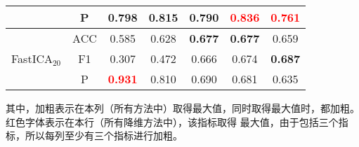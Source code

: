 \documentclass{acm_proc_article-sp}
\begin{document}
\begin{table}[!ht]
{\begin{tabular}{@{}c@{\hskip 0mm}c|ccccc@{}}
                                   &P    &0.798                              &0.815                             &0.790                             &\textcolor{red}{\textbf{0.836}}   &\textcolor{red}{0.761}\\ \midrule
\multirow{3}{*}{FastICA$_{20}$}    &ACC  &0.585                              &0.628                             &\textbf{0.677}                    &\textbf{0.677}                    &0.659\\
                                   &F1   &0.307                              &0.472                             &0.666                             &0.674                             &\textbf{0.687}\\
                                   &P    &\textcolor{red}{\textbf{0.931}}    &0.810                             &0.690                             &0.681                             &0.635\\ \bottomrule
\end{tabular}
}
\label{JHSY}
\end{table}

\begin{table}[!ht]
\centering
\small
\caption{未均衡实验结果}
\label{WJHSY}
\end{table}
其中，加粗表示在本列（所有方法中）取得最大值，同时取得最大值时，都加粗。红色字体表示在本行（所有降维方法中），该指标取得
最大值，由于包括三个指标，所以每列至少有三个指标进行加粗。
\end{document}

